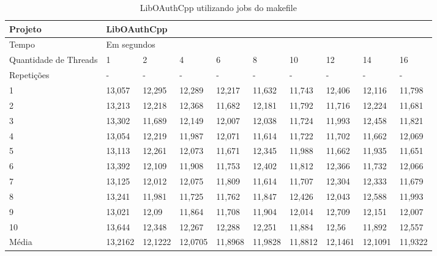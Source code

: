 \begin{table}[h]
\centering
\begin{tabular}{|p{1cm}|p{1.4cm}|p{1.4cm}|p{1.4cm}|p{1.4cm}|p{1.4cm}|p{1.4cm}|p{1.4cm}|p{1.4cm}|p{1.4cm}|}
\hline
Projeto               & \multicolumn{9}{l|}{LibOAuthCpp}        \\ \hline
Tempo                 & \multicolumn{9}{l|}{Em segundos}      \\ \hline
Quantidade de Threads & 1 & 2 & 4 & 6 & 8 & 10 & 12 & 14 & 16 \\ \hline
Repetições            & - & - & - & - & - & -  & -  & -  & -  \\ \hline
1 & 13,057   & 12,295   & 12,289   & 12,217   &  11,632   &  11,743  &  12,406  &   12,116  &   11,798 \\ \hline
2 & 13,213   & 12,218   & 12,368   & 11,682   &  12,181   &  11,792  &  11,716  &   12,224  &   11,681 \\ \hline
3 & 13,302   & 11,689   & 12,149   & 12,007   &  12,038   &  11,724  &  11,993  &   12,458  &   11,821 \\ \hline
4 & 13,054   & 12,219   & 11,987   & 12,071   &  11,614   &  11,722  &  11,702  &   11,662  &   12,069 \\ \hline
5 & 13,113   & 12,261   & 12,073   & 11,671   &  12,345   &  11,988  &  11,662  &   11,935  &   11,651 \\ \hline
6 & 13,392   & 12,109   & 11,908   & 11,753   &  12,402   &  11,812  &  12,366  &   11,732  &   12,066 \\ \hline
7 & 13,125   & 12,012   & 12,075   & 11,809   &  11,614   &  11,707  &  12,304  &   12,333  &   11,679 \\ \hline
8 & 13,241   & 11,981   & 11,725   & 11,762   &  11,847   &  12,426  &  12,043  &   12,588  &   11,993 \\ \hline
9 & 13,021   & 12,09    & 11,864   & 11,708   &  11,904   &  12,014  &  12,709  &   12,151  &   12,007 \\ \hline
10 & 13,644   & 12,348   & 12,267   & 12,288   &  12,251   &  11,884  &  12,56   &   11,892  &   12,557 \\ \hline
Média & 13,2162  & 12,1222  & 12,0705  & 11,8968  &  11,9828  &  11,8812 &  12,1461 &   12,1091 &   11,9322 \\ \hline
\end{tabular}
\caption{LibOAuthCpp utilizando jobs do makefile}
\label{tab:liboauthcpp}
\end{table}


